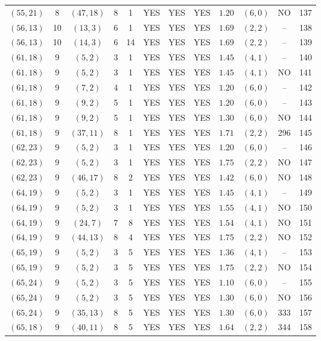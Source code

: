 \begin{longtable}{|c|c|c|c|c|c|c|c|c|c|c|c|}
$(55,21)$ & 8 & $(47,18)$ & 8 & 1 & YES & YES & YES & $1.20$ & $(6,0)$ & NO & 137\\
$(56,13)$ & 10 & $(13,3)$ & 6 & 1 & YES & YES & YES & $1.69$ & $(2,2)$ & -- & 138\\
$(56,13)$ & 10 & $(14,3)$ & 6 & 14 & YES & YES & YES & $1.69$ & $(2,2)$ & -- & 139\\
$(61,18)$ & 9 & $(5,2)$ & 3 & 1 & YES & YES & YES & $1.45$ & $(4,1)$ & -- & 140\\
$(61,18)$ & 9 & $(5,2)$ & 3 & 1 & YES & YES & YES & $1.45$ & $(4,1)$ & NO & 141\\
$(61,18)$ & 9 & $(7,2)$ & 4 & 1 & YES & YES & YES & $1.20$ & $(6,0)$ & -- & 142\\
$(61,18)$ & 9 & $(9,2)$ & 5 & 1 & YES & YES & YES & $1.20$ & $(6,0)$ & -- & 143\\
$(61,18)$ & 9 & $(9,2)$ & 5 & 1 & YES & YES & YES & $1.30$ & $(6,0)$ & NO & 144\\
$(61,18)$ & 9 & $(37,11)$ & 8 & 1 & YES & YES & YES & $1.71$ & $(2,2)$ & 296 & 145\\
$(62,23)$ & 9 & $(5,2)$ & 3 & 1 & YES & YES & YES & $1.20$ & $(6,0)$ & -- & 146\\
$(62,23)$ & 9 & $(5,2)$ & 3 & 1 & YES & YES & YES & $1.75$ & $(2,2)$ & NO & 147\\
$(62,23)$ & 9 & $(46,17)$ & 8 & 2 & YES & YES & YES & $1.42$ & $(6,0)$ & NO & 148\\
$(64,19)$ & 9 & $(5,2)$ & 3 & 1 & YES & YES & YES & $1.45$ & $(4,1)$ & -- & 149\\
$(64,19)$ & 9 & $(5,2)$ & 3 & 1 & YES & YES & YES & $1.55$ & $(4,1)$ & NO & 150\\
$(64,19)$ & 9 & $(24,7)$ & 7 & 8 & YES & YES & YES & $1.54$ & $(4,1)$ & NO & 151\\
$(64,19)$ & 9 & $(44,13)$ & 8 & 4 & YES & YES & YES & $1.75$ & $(2,2)$ & NO & 152\\
$(65,19)$ & 9 & $(5,2)$ & 3 & 5 & YES & YES & YES & $1.36$ & $(4,1)$ & -- & 153\\
$(65,19)$ & 9 & $(5,2)$ & 3 & 5 & YES & YES & YES & $1.75$ & $(2,2)$ & NO & 154\\
$(65,24)$ & 9 & $(5,2)$ & 3 & 5 & YES & YES & YES & $1.10$ & $(6,0)$ & -- & 155\\
$(65,24)$ & 9 & $(5,2)$ & 3 & 5 & YES & YES & YES & $1.30$ & $(6,0)$ & NO & 156\\
$(65,24)$ & 9 & $(35,13)$ & 8 & 5 & YES & YES & YES & $1.30$ & $(6,0)$ & 333 & 157\\
$(65,18)$ & 9 & $(40,11)$ & 8 & 5 & YES & YES & YES & $1.64$ & $(2,2)$ & 344 & 158\\

\end{longtable}
